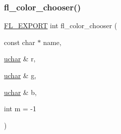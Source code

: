 \mbox{\label{_fl___color___chooser_8_h_ab97a052d90d001d273a9891a34162102}} 
\subsubsection{\texorpdfstring{fl\+\_\+color\+\_\+chooser()}{fl\_color\_chooser()}\hspace{0.1cm}{\footnotesize\ttfamily [2/2]}}
{\footnotesize\ttfamily \hyperlink{_fl___export_8_h_aa9ba29a18aee9d738370a06eeb4470fc}{F\+L\+\_\+\+E\+X\+P\+O\+RT} int fl\+\_\+color\+\_\+chooser (\begin{DoxyParamCaption}\item[{const char $\ast$}]{name,  }\item[{\hyperlink{fl__types_8h_a65f85814a8290f9797005d3b28e7e5fc}{uchar} \&}]{r,  }\item[{\hyperlink{fl__types_8h_a65f85814a8290f9797005d3b28e7e5fc}{uchar} \&}]{g,  }\item[{\hyperlink{fl__types_8h_a65f85814a8290f9797005d3b28e7e5fc}{uchar} \&}]{b,  }\item[{int}]{m = {\ttfamily -\/1} }\end{DoxyParamCaption})}

